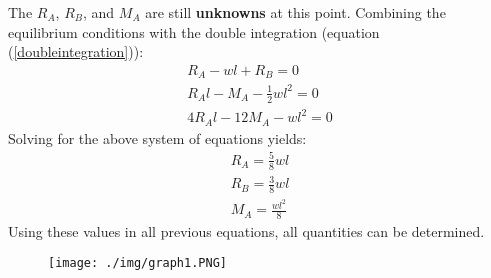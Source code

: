 The $R_A$, $R_B$, and $M_A$ are still \textbf{unknowns} at this point. Combining the equilibrium conditions with the double integration (equation (\ref{doubleintegration})):
\begin{gather}
  R_A-wl+R_B = 0 \\
  R_Al-M_A-\frac{1}{2}wl^2 = 0 \\
  4R_Al-12M_A-wl^2 = 0
\end{gather}
Solving for the above system of equations yields:
\begin{gather}
  R_A = \frac{5}{8}wl \\
  R_B = \frac{3}{8}wl \\
  M_A = \frac{wl^2}{8}
\end{gather}
Using these values in all previous equations, all quantities can be determined.
\begin{figure}[H]
  \centering
  \texttt{[image: ./img/graph1.PNG]}
\end{figure}
